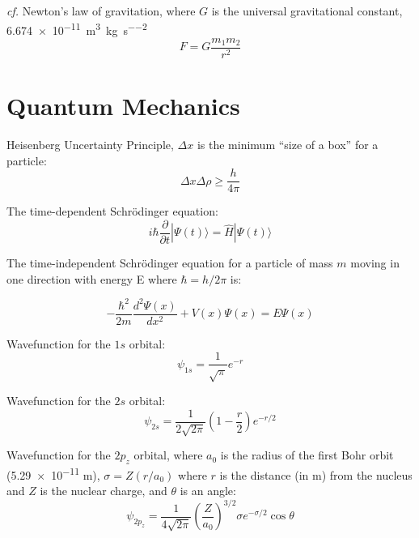 \documentclass[10pt]{article}
\begin{document}
\textit{cf.} Newton's law of gravitation, where $G$ is the universal gravitational constant, \num{6.674e-11}~\si{\cubic\meter\per\kg\per\second\squared}
\begin{equation*}
F = G\frac{m_1m_2}{r^2}
\end{equation*}

\newpage
\section{Quantum Mechanics}

Heisenberg Uncertainty Principle, $\Delta x$ is the minimum ``size of a box'' for a particle:
\begin{equation*}
\Delta x \Delta\rho \ge \frac{h}{4\pi}
\end{equation*}

The time-dependent Schr\"odinger equation:
\begin{equation*}
i\hbar\frac{\partial}{\partial t}|\Psi(t)\rangle = \hat{H}|\Psi(t)\rangle
\end{equation*}

The time-independent Schr\"odinger equation for a particle of mass $m$ moving in one direction with energy E where $\hbar=h/2\pi$ is:

\begin{equation*}
-\frac{\hbar^2}{2m}\frac{d^2\Psi(x)}{dx^2}+V(x)\Psi(x)=E\Psi(x)
\end{equation*}

Wavefunction for the $1s$ orbital:
\begin{equation*}
\psi_{1s} = \frac{1}{\sqrt{\pi}}e^{-r}
\end{equation*}

Wavefunction for the $2s$ orbital:
\begin{equation*}
\psi_{2s} = \frac{1}{2\sqrt{2\pi}}\left(1-\frac{r}{2}\right)e^{-r/2}
\end{equation*}

Wavefunction for the $2p_z$ orbital, where $a_0$ is the radius of the first Bohr orbit (\num{5.29e-11} m), $\sigma = Z(r/a_0)$ 
where $r$ is the distance (in m) from the nucleus and $Z$ is the nuclear charge, and $\theta$ is an angle:
\begin{equation*}
\psi_{2p_z} = \frac{1}{4\sqrt{2\pi}}\left(\frac{Z}{a_0}\right)^{3/2}\sigma e^{-\sigma/2}\cos\theta
\end{equation*}
\end{document}
